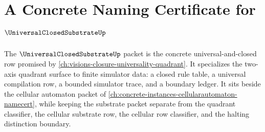\chapter{A Concrete Naming Certificate for $\UniversalClosedSubstrateUp$}
\label{ch:concrete-instances-universal-closed-substrate-namecert}

The $\UniversalClosedSubstrateUp$ packet is the concrete universal-and-closed row promised by \autoref{ch:visions-closure-universality-quadrant}. It specializes the two-axis quadrant surface to finite simulator data: a closed rule table, a universal compilation row, a bounded simulator trace, and a boundary ledger. It sits beside the cellular automaton packet of \autoref{ch:concrete-instances-cellularautomaton-namecert}, while keeping the substrate packet separate from the quadrant classifier, the cellular substrate row, the cellular row classifier, and the halting distinction boundary.



